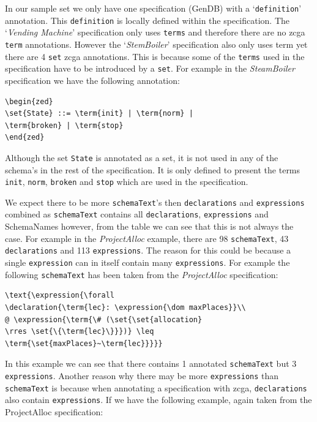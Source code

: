 In our sample set we only have one specification (GenDB) with a
`\texttt{definition}' annotation. This \texttt{definition} is locally defined
within the specification. The `\emph{Vending Machine}' specification only uses
\texttt{terms} and therefore there are no \gls{zcga} \texttt{term} annotations.
However the `\emph{StemBoiler}' specification also only uses term yet there are
4 \texttt{set} \gls{zcga} annotations. This is because some of the
\texttt{terms} used in the specification have to be introduced by a \texttt{set}.
For example in the \emph{SteamBoiler} specification we have the following
annotation:

\begin{verbatim}
\begin{zed}
\set{State} ::= \term{init} | \term{norm} |
\term{broken} | \term{stop}
\end{zed}
\end{verbatim}

Although the set \verb|State| is annotated as a set, it is not used in any of
the schema's in the rest of the specification. It is only defined to present the
terms \verb|init|, \verb|norm|, \verb|broken| and \verb|stop| which are used in
the specification.

We expect there to be more \texttt{schemaText}'s then \texttt{declarations} and
\texttt{expressions} combined as \texttt{schemaText} contains all
\texttt{declarations}, \texttt{expressions} and SchemaNames however, from the
table we can see that this is not always the case. For example in the
\emph{ProjectAlloc} example, there are 98 \texttt{schemaText}, 43
\texttt{declarations} and 113 \texttt{expressions}. The reason for this could be
because a single \texttt{expression} can in itself contain many
\texttt{expressions}. For example the following \texttt{schemaText} has been
taken from the \emph{ProjectAlloc} specification:

\begin{verbatim}
\text{\expression{\forall 
\declaration{\term{lec}: \expression{\dom maxPlaces}}\\
@ \expression{\term{\# (\set{\set{allocation}
\rres \set{\{\term{lec}\}}})} \leq \term{\set{maxPlaces}~\term{lec}}}}}
\end{verbatim}

In this example we can see that there contains 1 annotated \texttt{schemaText}
but 3 \texttt{expressions}. Another reason why there may be more
\texttt{expressions} than \texttt{schemaText} is because when annotating a
specification with \gls{zcga}, \texttt{declarations} also contain
\texttt{expressions}. If we have the following example, again taken from the
ProjectAlloc specification:

